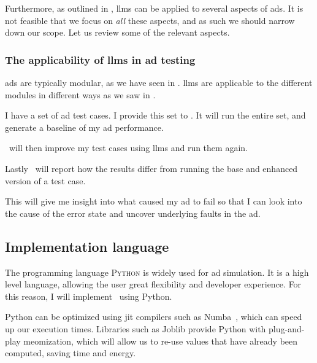 Furthermore, as outlined in \citeauthor{LLM4AD}, \acrlong{llms} can be applied to several aspects
of \acrlong{ads}. It is not feasible that we focus on \textit{all} these aspects, and as such we
should narrow down our scope. Let us review some of the relevant aspects.

\subsubsection*{The applicability of \acrshort{llms} in \acrshort{ad} testing}

\acrlong{ads} are typically modular, as we have seen in .
\acrshort{llms} are applicable to the different modules in different ways as we saw in
.

\begin{tcolorbox}[colback=gray!5!white,colframe=gray!75!black,title=User history
        of using \hefe]\label{user-history}
    I have a set of \acrfull{ad} test cases. I provide this set to \hefe. It will run the entire
    set, and generate a baseline of my \acrshort{ad} performance.

    \hefe~will then improve my test cases using \acrlong{llms} and run them again.

    Lastly \hefe~will report how the results differ from running the base and enhanced version of a
    test case.

    This will give me insight into what caused my \acrshort{ad} to fail so that I can look into the
    cause of the error state and uncover underlying faults in the \acrlong{ad}.

\end{tcolorbox}


\subsection{Implementation language}

The programming language \textsc{Python} is widely used for \acrfull{ad} simulation. It is a high
level language, allowing the user great flexibility and developer experience. For this reason, I will
implement \hefe~using Python.

Python can be optimized using \acrfull{jit} compilers such as Numba~\cite{numba}, which can speed up
our execution times. Libraries such as Joblib provide Python with plug-and-play
meomization, which will allow us to re-use values that have already been
computed, saving time and energy.

